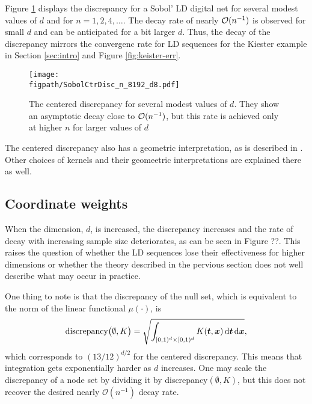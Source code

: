\documentclass{svproc}
\newcommand{\figpath}{Figures}
\begin{document}
Figure \ref{fig:ctrdiscmodestd} displays the discrepancy for a Sobol' LD digital net for several modest values of $d$ and for $n =  1, 2, 4, \ldots$.  The decay rate of nearly ${\mathcal{O}}(n^{-1})$ is observed for small $d$ and can be anticipated for a bit larger $d$.  Thus, the decay of the discrepancy mirrors the convergenc rate for LD sequences for the Kiester example in Section \ref{sec:intro} and Figure \ref{fig:keister-err}.

\begin{figure}
	\centering
	\texttt{[image: \\figpath/SobolCtrDisc\_n\_8192\_d8.pdf]}
	\caption{The centered discrepancy for several modest values of $d$.  They show an asymptotic decay close to ${\mathcal{O}}(n^{-1})$, but this rate is achieved only at higher $n$ for larger values of $d$ \label{fig:ctrdiscmodestd}}
\end{figure}

The centered discrepancy also has a geometric interpretation, as is described in \cite{Hic97a}. Other choices of kernels and their geomeetric interpretations are explained there as well.


\subsection{Coordinate weights} \label{sec:coordwts}
When the dimension, $d$, is increased, the discrepancy increases and the rate of decay with increasing sample size deteriorates, as can be seen in Figure ??.  This raises the question of whether the LD sequences lose their effectiveness for higher dimensions or whether the theory described in the pervious section does not well describe what may occur in practice.

One thing to note is that the discrepancy of the null set, which is equivalent to the norm of the linear functional $\mu(\cdot)$, is
\begin{equation}
		\text{discrepancy}\bigl(\emptyset,K \bigr)  = \sqrt{\int_{[0,1)^d \times [0,1)^d} K({\boldsymbol{t}},{\boldsymbol{x}}) \, \mathrm{d} {\boldsymbol{t}} \, \mathrm{d} {\boldsymbol{x}}},
\end{equation}
which corresponds to $(13/12)^{d/2}$ for the centered discrepancy.  This means that integration gets exponentially harder as $d$ increases.  One may scale the discrepancy of a node set by dividing it by discrepancy$(\emptyset,K)$, but this does not recover the desired nearly $\mathcal{O}(n^{-1})$ decay rate.
\end{document}
